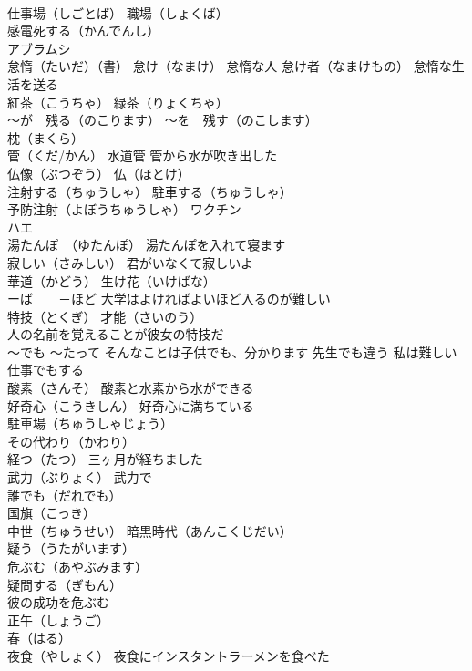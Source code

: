 \documentclass[8pt]{extreport}
\begin{document}
\begin{CJK}{UTF8}{min}
\\	仕事場（しごとば） 職場（しょくば）
\\	感電死する（かんでんし）
\\	アブラムシ
\\	怠惰（たいだ）（書） 怠け（なまけ） 怠惰な人 怠け者（なまけもの） 怠惰な生活を送る
\\	紅茶（こうちゃ） 緑茶（りょくちゃ）
\\	～が　残る（のこります） ～を　残す（のこします）
\\	枕（まくら）
\\	管（くだ/かん） 水道管 管から水が吹き出した
\\	仏像（ぶつぞう） 仏（ほとけ）
\\	注射する（ちゅうしゃ） 駐車する（ちゅうしゃ）
\\	予防注射（よぼうちゅうしゃ） ワクチン 
\\	ハエ
\\	湯たんぽ　（ゆたんぽ） 湯たんぽを入れて寝ます
\\	寂しい（さみしい） 君がいなくて寂しいよ
\\	華道（かどう） 生け花（いけばな）
\\	ーば　　－ほど 大学はよければよいほど入るのが難しい
\\	特技（とくぎ） 才能（さいのう） 
\\	人の名前を覚えることが彼女の特技だ
\\	～でも ～たって そんなことは子供でも、分かります 先生でも違う 私は難しい仕事でもする
\\	酸素（さんそ） 酸素と水素から水ができる
\\	好奇心（こうきしん） 好奇心に満ちている
\\	駐車場（ちゅうしゃじょう）
\\	その代わり（かわり）
\\	経つ（たつ） 三ヶ月が経ちました
\\	武力（ぶりょく） 武力で
\\	誰でも（だれでも）
\\	国旗（こっき）
\\	中世（ちゅうせい） 暗黒時代（あんこくじだい）
\\	疑う（うたがいます）
\\	危ぶむ（あやぶみます）
\\	疑問する（ぎもん）
\\	彼の成功を危ぶむ
\\	正午（しょうご）
\\	春（はる）
\\	夜食（やしょく） 夜食にインスタントラーメンを食べた

\end{CJK}
\end{document}
